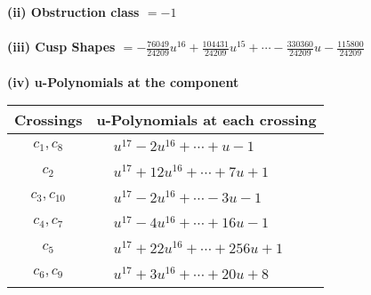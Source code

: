 \documentclass[1p]{elsarticle_modified}
\theoremstyle{definition}
\begin{document}
\flushleft \textbf{(ii) Obstruction class $= -1$}\\~\\
\flushleft \textbf{(iii) Cusp Shapes $= -\frac{76049}{24209} u^{16}+\frac{104431}{24209} u^{15}+\cdots-\frac{330360}{24209} u-\frac{115800}{24209}$}\\~\\
\newpage\renewcommand{\arraystretch}{1}
\flushleft \textbf{(iv) u-Polynomials at the component}\newline \\
\begin{tabular}{m{50pt}|m{274pt}}
Crossings & \hspace{64pt}u-Polynomials at each crossing \\
\hline $$\begin{aligned}c_{1},c_{8}\end{aligned}$$&$\begin{aligned}
&u^{17}-2 u^{16}+\cdots+u-1
\end{aligned}$\\
\hline $$\begin{aligned}c_{2}\end{aligned}$$&$\begin{aligned}
&u^{17}+12 u^{16}+\cdots+7 u+1
\end{aligned}$\\
\hline $$\begin{aligned}c_{3},c_{10}\end{aligned}$$&$\begin{aligned}
&u^{17}-2 u^{16}+\cdots-3 u-1
\end{aligned}$\\
\hline $$\begin{aligned}c_{4},c_{7}\end{aligned}$$&$\begin{aligned}
&u^{17}-4 u^{16}+\cdots+16 u-1
\end{aligned}$\\
\hline $$\begin{aligned}c_{5}\end{aligned}$$&$\begin{aligned}
&u^{17}+22 u^{16}+\cdots+256 u+1
\end{aligned}$\\
\hline $$\begin{aligned}c_{6},c_{9}\end{aligned}$$&$\begin{aligned}
&u^{17}+3 u^{16}+\cdots+20 u+8
\end{aligned}$\\
\hline
\end{tabular}\\~\\
\end{document}
